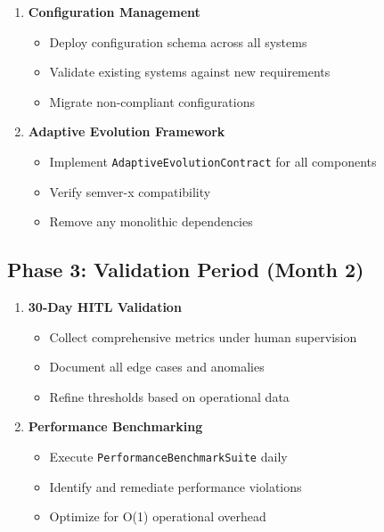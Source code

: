 \documentclass[12pt,a4paper]{article}
\begin{document}
\begin{enumerate}
    \item \textbf{Configuration Management}
    \begin{itemize}
        \item Deploy configuration schema across all systems
        \item Validate existing systems against new requirements
        \item Migrate non-compliant configurations
    \end{itemize}
    
    \item \textbf{Adaptive Evolution Framework}
    \begin{itemize}
        \item Implement \texttt{AdaptiveEvolutionContract} for all components
        \item Verify semver-x compatibility
        \item Remove any monolithic dependencies
    \end{itemize}
\end{enumerate}

\subsection{Phase 3: Validation Period (Month 2)}

\begin{enumerate}
    \item \textbf{30-Day HITL Validation}
    \begin{itemize}
        \item Collect comprehensive metrics under human supervision
        \item Document all edge cases and anomalies
        \item Refine thresholds based on operational data
    \end{itemize}
    
    \item \textbf{Performance Benchmarking}
    \begin{itemize}
        \item Execute \texttt{PerformanceBenchmarkSuite} daily
        \item Identify and remediate performance violations
        \item Optimize for O(1) operational overhead
    \end{itemize}
\end{enumerate}
\end{document}

